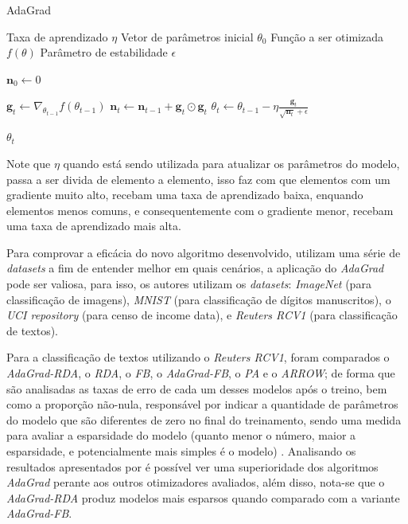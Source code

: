 \begin{algorithm}[H] %
    \caption{AdaGrad}
    \label{alg:adagrad}
    \begin{algorithmic}[1] %

    \Require Taxa de aprendizado $\eta$
    \Require Vetor de parâmetros inicial $\theta_0$
    \Require Função a ser otimizada $f(\theta)$
    \Require Parâmetro de estabilidade $\epsilon$

    \State $\mathbf{n}_0 \leftarrow 0$ 

        \State $\textbf{g}_t \leftarrow \nabla_{\theta_{t-1}} f(\theta_{t-1})$
        \State $\textbf{n}_t \leftarrow \textbf{n}_{t-1} + \mathbf{g}_t \odot \mathbf{g}_t$
        \State $\theta_t \leftarrow \theta_{t-1} - \eta \frac{\textbf{g}_t}{\sqrt{\textbf{n}_t} + \epsilon}$
    \EndWhile

    \State \Return $\theta_t$ 
    \end{algorithmic}
\end{algorithm}

Note que $\eta$ quando está sendo utilizada para atualizar os parâmetros do modelo, passa a ser divida de elemento a elemento, isso faz com que elementos com um gradiente muito alto, recebam uma taxa de aprendizado baixa, enquando elementos menos comuns, e consequentemente com o gradiente menor, recebam uma taxa de aprendizado mais alta. 

Para comprovar a eficácia do novo algoritmo desenvolvido, \textcite{AdaGradMethod} utilizam uma série de \textit{datasets} a fim de entender melhor em quais cenários, a aplicação do \textit{AdaGrad} pode ser valiosa, para isso, os autores utilizam os \textit{datasets}: \textit{ImageNet} (para classificação de imagens), \textit{MNIST} (para classificação de dígitos manuscritos), o \textit{UCI repository} (para censo de income data), e \textit{Reuters RCV1} (para classificação de textos).

Para a classificação de textos utilizando o \textit{Reuters RCV1}, foram comparados o \textit{AdaGrad-RDA}, o \textit{RDA}, o \textit{FB}, o \textit{AdaGrad-FB}, o \textit{PA} e o \textit{ARROW}; de forma que são analisadas as taxas de erro de cada um desses modelos após o treino, bem como a proporção não-nula, responsável por indicar a quantidade de parâmetros do modelo que são diferentes de zero no final do treinamento, sendo uma medida para avaliar a esparsidade do modelo (quanto menor o número, maior a esparsidade, e potencialmente mais simples é o modelo) \parencite{AdaGradMethod}. Analisando os resultados apresentados por \textcite{AdaGradMethod} é possível ver uma superioridade dos algoritmos \textit{AdaGrad} perante aos outros otimizadores avaliados, além disso, nota-se que o \textit{AdaGrad-RDA} produz modelos mais esparsos quando comparado com a variante \textit{AdaGrad-FB}.


